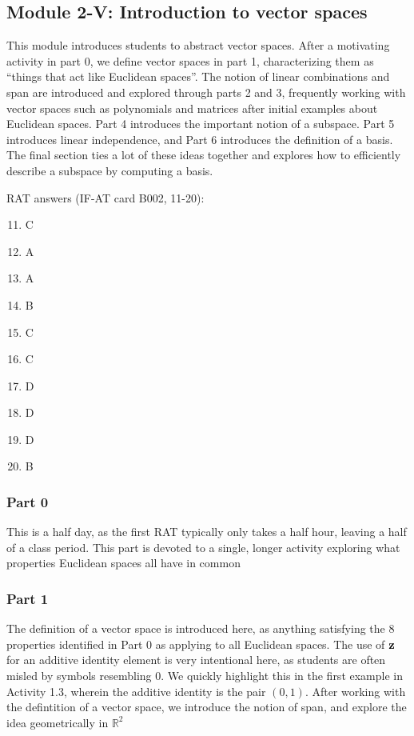 \documentclass{article}
\begin{document}
\subsection*{Module 2-V: Introduction to vector spaces}
This module introduces students to abstract vector spaces.  After a motivating activity in part 0, we define vector spaces in part 1, characterizing them as ``things that act like Euclidean spaces''.  The notion of linear combinations and span are introduced and explored through parts 2 and 3, frequently working with vector spaces such as polynomials and matrices after initial examples about Euclidean spaces.  Part 4 introduces the important notion of a subspace.  Part 5 introduces linear independence, and Part 6 introduces the definition of a basis.  The final section ties a lot of these ideas together and explores how to efficiently describe a subspace by computing a basis.

RAT answers (IF-AT card B002, 11-20):
\begin{multicols}{10}
\begin{enumerate}[1)]
\setcounter{enumi}{10}
\item C
\item A
\item A
\item B
\item C
\item C
\item D
\item D
\item D
\item B
\end{enumerate}
\end{multicols}

\subsubsection*{Part 0}
This is a half day, as the first RAT typically only takes a half hour, leaving a half of a class period.  This part is devoted to a single, longer activity exploring what properties Euclidean spaces all have in common

\subsubsection*{Part 1}
The definition of a vector space is introduced here, as anything satisfying the 8 properties identified in Part 0 as applying to all Euclidean spaces.  The use of $\bf{z}$ for an additive identity element is very intentional here, as students are often misled by symbols resembling $0$.  We quickly highlight this in the first example in Activity 1.3, wherein the additive identity is the pair $(0,1)$.  After working with the defintition of a vector space, we introduce the notion of span, and explore the idea geometrically in $\mathbb{R}^2$
\end{document}
